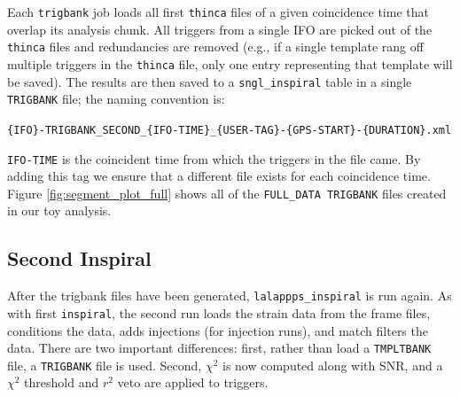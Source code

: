 Each \texttt{trigbank} job loads all first \texttt{thinca} files of a given coincidence time that overlap its analysis chunk. All triggers from a single \ac{IFO} are picked out of the \texttt{thinca} files and redundancies are removed (e.g., if a single template rang off multiple triggers in the \texttt{thinca} file, only one entry representing that template will be saved). The results are then saved to a \texttt{sngl\_inspiral} table in a single \texttt{TRIGBANK} file; the naming convention is:
\begin{center}
\texttt{\{IFO\}-TRIGBANK\_SECOND\_\{IFO-TIME\}\_\{USER-TAG\}-\{GPS-START\}-\{DURATION\}.xml}
\end{center}
\texttt{IFO-TIME} is the coincident time from which the triggers in the file came. By adding this tag we ensure that a different file exists for each coincidence time. Figure \ref{fig:segment_plot_full} shows all of the \texttt{FULL\_DATA TRIGBANK} files created in our toy analysis.

\subsection{Second Inspiral}
\label{sec:second_inspiral}

After the trigbank files have been generated, \texttt{lalappps\_inspiral} is run again. As with first \texttt{inspiral}, the second run loads the strain data from the frame files, conditions the data, adds injections (for injection runs), and match filters the data. There are two important differences: first, rather than load a \texttt{TMPLTBANK} file, a \texttt{TRIGBANK} file is used. Second, $\chi^2$ is now computed along with \ac{SNR}, and a $\chi^2$ threshold and $r^2$ veto are applied to triggers.

